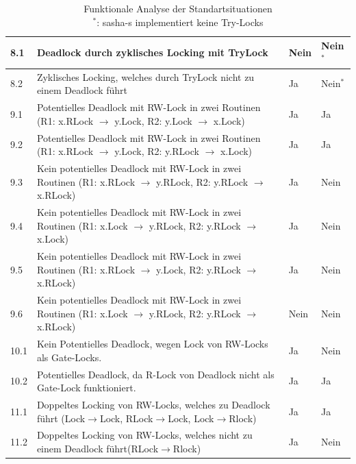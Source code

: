 \begin{table}[H]
\begin{tabular}{|l|l|l|l|}
    8.1 & Deadlock durch zyklisches Locking mit TryLock & Nein &Nein$^*$ \\ \hline
    8.2 & \makecell[l]{Zyklisches Locking, welches durch TryLock nicht zu\\einem Deadlock führt} & Ja &Nein$^*$ \\ \hline   
    9.1 & \makecell[l]{Potentielles Deadlock mit RW-Lock in zwei Routinen\\(R1: x.RLock $\to$ y.Lock, R2: y.Lock $\to$ x.Lock)} & Ja & Ja \\ \hline
    9.2 & \makecell[l]{Potentielles Deadlock mit RW-Lock in zwei Routinen\\(R1: x.RLock $\to$ y.Lock, R2: y.RLock $\to$ x.Lock)} & Ja & Ja \\ \hline
    9.3 & \makecell[l]{Kein potentielles Deadlock mit RW-Lock in zwei Routinen\\(R1: x.RLock $\to$ y.RLock, R2: y.RLock $\to$ x.RLock)} & Ja & Nein \\ \hline
    9.4 & \makecell[l]{Kein potentielles Deadlock mit RW-Lock in zwei Routinen\\(R1: x.Lock $\to$ y.RLock, R2: y.RLock $\to$ x.Lock)} & Ja & Nein \\ \hline
    9.5 & \makecell[l]{Kein potentielles Deadlock mit RW-Lock in zwei Routinen\\(R1: x.RLock $\to$ y.Lock, R2: y.RLock $\to$ x.RLock)} & Ja & Nein \\ \hline
    9.6 & \makecell[l]{Kein potentielles Deadlock mit RW-Lock in zwei Routinen\\(R1: x.Lock $\to$ y.RLock, R2: y.RLock $\to$ x.RLock)} & Nein & Nein \\ \hline
    10.1 & \makecell[l]{Kein Potentielles Deadlock, wegen Lock von RW-Locks\\als Gate-Locks.} & Ja & Nein \\ \hline
    10.2 & \makecell[l]{Potentielles Deadlock, da R-Lock von Deadlock nicht als\\Gate-Lock funktioniert.} & Ja & Ja \\ \hline
    11.1 & \makecell[l]{Doppeltes Locking von RW-Locks, welches zu Deadlock führt\\(Lock$\to$Lock, RLock$\to$Lock, Lock$\to$Rlock)} & Ja & Ja \\ \hline
    11.2 & \makecell[l]{Doppeltes Locking von RW-Locks, welches nicht zu einem\\Deadlock führt(RLock$\to$Rlock)} & Ja & Nein \\ \hline
\end{tabular}
\caption{Funktionale Analyse der Standartsituationen\\$^*$: sasha-s implementiert keine Try-Locks}
\label{Tab::Analyse:Functional.Standart}
\end{table}
